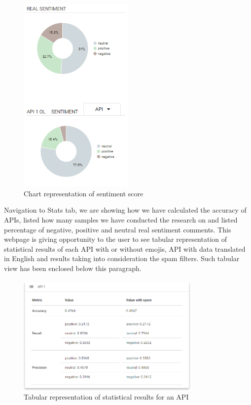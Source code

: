 \begin{figure}[ht]
	\centering	
	\includegraphics[width=0.5\textwidth]{04-framework/03-user-interface/images/pie_chart.png}
	\caption[Chart representation of sentiment score]{Chart representation of sentiment score \label{fig:pie-fragment}}
\end{figure}

Navigation to Stats tab, we are showing how we have calculated the accuracy of APIs, listed how many samples we have conducted the research on and listed percentage of negative, positive and neutral real sentiment comments. This webpage is giving opportunity to the user to see tabular representation of statistical results of each API with or without emojis, API with data translated in English and results taking into consideration the spam filters. Such tabular view has been enclosed below this paragraph. 

\begin{figure}[ht]
	\centering
	\includegraphics[width=0.8\textwidth]{04-framework/03-user-interface/images/stats.png}
	\caption[Tabular representation of statistical results for an API]{Tabular representation of statistical results for an API \label{fig:stats}}
\end{figure}

